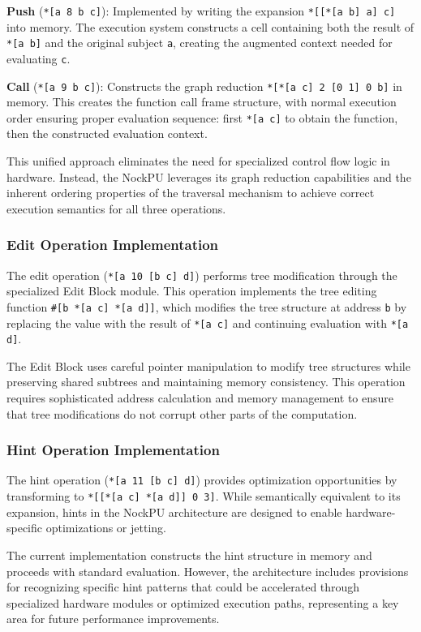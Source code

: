 \documentclass[twoside]{article}
\begin{document}
\textbf{Push} (\texttt{*[a 8 b c]}): Implemented by writing the expansion \texttt{*[[*[a b] a] c]} into memory. The execution system constructs a cell containing both the result of \texttt{*[a b]} and the original subject \texttt{a}, creating the augmented context needed for evaluating \texttt{c}.

\textbf{Call} (\texttt{*[a 9 b c]}): Constructs the graph reduction \texttt{*[*[a c] 2 [0 1] 0 b]} in memory. This creates the function call frame structure, with normal execution order ensuring proper evaluation sequence: first \texttt{*[a c]} to obtain the function, then the constructed evaluation context.

This unified approach eliminates the need for specialized control flow logic in hardware. Instead, the NockPU leverages its graph reduction capabilities and the inherent ordering properties of the traversal mechanism to achieve correct execution semantics for all three operations.

\subsubsection{Edit Operation Implementation}

The edit operation (\texttt{*[a 10 [b c] d]}) performs tree modification through the specialized Edit Block module. This operation implements the tree editing function \texttt{\#[b *[a c] *[a d]]}, which modifies the tree structure at address \texttt{b} by replacing the value with the result of \texttt{*[a c]} and continuing evaluation with \texttt{*[a d]}.

The Edit Block uses careful pointer manipulation to modify tree structures while preserving shared subtrees and maintaining memory consistency. This operation requires sophisticated address calculation and memory management to ensure that tree modifications do not corrupt other parts of the computation.

\subsubsection{Hint Operation Implementation}

The hint operation (\texttt{*[a 11 [b c] d]}) provides optimization opportunities by transforming to \texttt{*[[*[a c] *[a d]] 0 3]}. While semantically equivalent to its expansion, hints in the NockPU architecture are designed to enable hardware-specific optimizations or jetting.

The current implementation constructs the hint structure in memory and proceeds with standard evaluation. However, the architecture includes provisions for recognizing specific hint patterns that could be accelerated through specialized hardware modules or optimized execution paths, representing a key area for future performance improvements.
\end{document}
